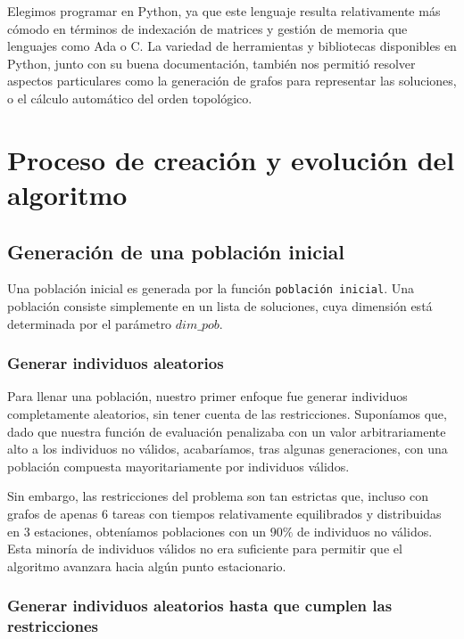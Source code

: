 \documentclass[12pt,a4paper]{report}
\begin{document}
    Elegimos programar en Python, ya que este lenguaje resulta relativamente más cómodo en términos de indexación de matrices y gestión de memoria que lenguajes como Ada o C. La variedad de herramientas y bibliotecas disponibles en Python, junto con su buena documentación, también nos permitió resolver aspectos particulares como la generación de grafos para representar las soluciones, o el cálculo automático del orden topológico.


    \chapter{Proceso de creación y evolución del algoritmo}

    \section{Generación de una población inicial}

    Una población inicial es generada por la función \texttt{población inicial}. Una población consiste simplemente en un lista de soluciones, cuya dimensión está determinada por el parámetro $dim\_pob$.

    \subsection*{Generar individuos aleatorios}

    Para llenar una población, nuestro primer enfoque fue generar individuos completamente aleatorios, sin tener cuenta de las restricciones. Suponíamos que, dado que nuestra función de evaluación penalizaba con un valor arbitrariamente alto a los individuos no válidos, acabaríamos, tras algunas generaciones, con una población compuesta mayoritariamente por individuos válidos.

    Sin embargo, las restricciones del problema son tan estrictas que, incluso con grafos de apenas $6$ tareas con tiempos relativamente equilibrados y distribuidas en $3$ estaciones, obteníamos poblaciones con un $90\%$ de individuos no válidos.
    Esta minoría de individuos válidos no era suficiente para permitir que el algoritmo avanzara hacia algún punto estacionario.

    \subsection*{Generar individuos aleatorios hasta que cumplen las restricciones}
\end{document}
